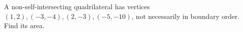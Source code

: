 A non-self-intersecting quadrilateral has vertices $(1,2),(-3,-4),(2,-3),(-5,-10)$, not necessarily in boundary order. Find its area.
